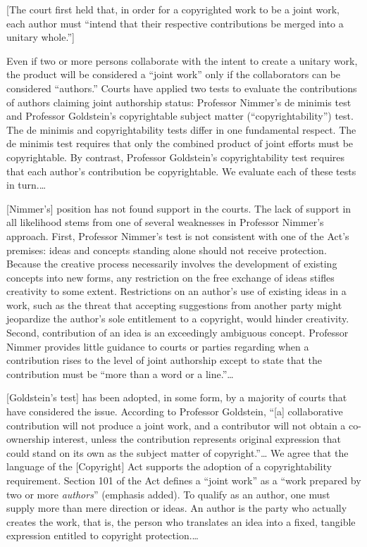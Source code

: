[The court first held that, in order for a copyrighted work to be a joint work,
each author must ``intend that their respective contributions be merged into a
unitary whole.'']

Even if two or more persons collaborate with the intent to create a unitary
work, the product will be considered a ``joint work'' only if the collaborators
can be considered ``authors.'' Courts have applied two tests to evaluate the
contributions of authors claiming joint authorship status: Professor Nimmer's de
minimis test and Professor Goldstein's copyrightable subject matter
(``copyrightability'') test. The de minimis and copyrightability tests differ in
one fundamental respect. The de minimis test requires that only the combined
product of joint efforts must be copyrightable. By contrast, Professor
Goldstein's copyrightability test requires that each author's contribution be
copyrightable. We evaluate each of these tests in turn.\ldots

[Nimmer's] position has not found support in the courts. The lack
of support in all likelihood stems from one of several weaknesses in Professor
Nimmer's approach. First, Professor Nimmer's test is not consistent with one of
the Act's premises: ideas and concepts standing alone should not receive
protection. Because the creative process necessarily involves the development of
existing concepts into new forms, any restriction on the free exchange of ideas
stifles creativity to some extent. Restrictions on an author's use of existing
ideas in a work, such as the threat that accepting suggestions from another
party might jeopardize the author's sole entitlement to a copyright, would
hinder creativity. Second, contribution of an idea is an exceedingly ambiguous
concept. Professor Nimmer provides little guidance to courts or parties
regarding when a contribution rises to the level of joint authorship except to
state that the contribution must be ``more than a word or a line.''\ldots

[Goldstein's test]
has been adopted, in some form, by a majority of courts that have considered
the issue. According to Professor
Goldstein, ``[a] collaborative contribution will not produce a joint work, and a
contributor will not obtain a co-ownership interest, unless the contribution
represents original expression that could stand on its own as the subject matter
of copyright.''\ldots
We agree that the language of the [Copyright] Act supports the adoption of a
copyrightability requirement. Section 101 of the Act defines a ``joint work'' as
a ``work prepared by two or more \textit{authors}'' (emphasis added). To qualify
as an author, one must supply more than mere direction or ideas. An author is
the party who actually creates the work, that is, the person who translates an
idea into a fixed, tangible expression entitled to copyright protection.\ldots

